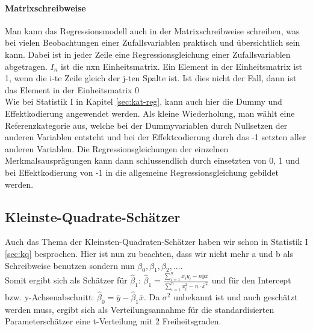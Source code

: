 \documentclass[a4paper]{article}
\begin{document}
\paragraph{Matrixschreibweise}Man kann das Regressionsmodell auch in der Matrixschreibweise schreiben, was bei vielen Beobachtungen einer Zufallsvariablen praktisch und übersichtlich sein kann. Dabei ist in jeder Zeile eine Regressionsgleichung einer Zufallsvariablen abgetragen. $I_n$ ist die nxn Einheitsmatrix. Ein Element in der Einheitsmatrix ist 1, wenn die i-te Zeile gleich der j-ten Spalte ist. Ist dies nicht der Fall, dann ist das Element in der Einheitsmatrix 0\\

\noindent Wie bei Statistik I in Kapitel \ref{sec:kat-reg}, kann auch hier die Dummy und Effektkodierung angewendet werden. Als kleine Wiederholung, man wählt eine Referenzkategorie aus, welche bei der Dummyvariablen durch Nullsetzen der anderen Variablen entsteht und bei der Effektcodierung durch das -1 setzten aller anderen Variablen. Die Regressionsgleichungen der einzelnen Merkmalsausprägungen kann dann schlussendlich durch einsetzten von 0, 1 und bei Effektkodierung von -1 in die allgemeine Regressionsgleichung gebildet werden.
\subsection{Kleinste-Quadrate-Schätzer}
Auch das Thema der Kleinsten-Quadraten-Schätzer haben wir schon in Statistik I \ref{sec:kq} besprochen. Hier ist nun zu beachten, dass wir nicht mehr a und b als Schreibweise benutzen sondern nun $\beta_0, \beta_1, \beta_2,....$\\
Somit ergibt sich als Schätzer für $\hat{\beta}_1$: $\hat{\beta}_1=\frac{\sum_{i=1}^n x_iy_i-n\bar y\bar x}{\sum_{i=1}^n x^2_i-n\cdot \bar x^2}$ und für den Intercept bzw. y-Achsenabschnitt: $\hat\beta_0=\bar y-\hat\beta_1\bar x$.
Da $\sigma^2$ unbekannt ist und auch geschätzt werden muss, ergibt sich als Verteilungsannahme für die standardisierten Parameterschätzer eine t-Verteilung mit 2 Freiheitsgraden.
\end{document}

